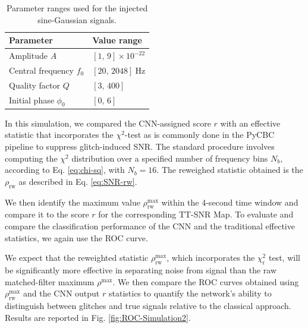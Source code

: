 \documentclass[aps,prd,twocolumn,superscriptaddress,nofootinbib, longbibliography]{revtex4-2}
\begin{document}
\begin{table}[htbp]
  \centering
  \caption{Parameter ranges used for the injected sine-Gaussian signals.}
  \label{tab:sine-Gaussian}
  \begin{tabular}{ |p{3.5cm}||p{4.5cm}| }
    \hline
    \textbf{Parameter} & \textbf{Value range} \\
    \hline
    Amplitude \( A \) & \( [1,\,9]\times10^{-22} \) \\
    \hline
    Central frequency \( f_0 \) & \( [20,\, 2048]~\mathrm{Hz} \) \\
    \hline
    Quality factor \( Q \) & \( [3,\, 400] \) \\
    \hline
    Initial phase \( \phi_0 \) & \( [0,\, 6] \) \\
    \hline
  \end{tabular}
\end{table}

	In this simulation, we compared the CNN-assigned score $r$ with an effective statistic that incorporates the $\chi^2$-test as is commonly done in the PyCBC pipeline to suppress glitch-induced SNR. 
	The standard procedure involves computing the $\chi^2$ distribution over a specified number of frequency bins $N_b$, according to Eq. \ref{eq:chi-sq}, with $N_b = 16$. The reweighed statistic obtained is the $\rho_\mathrm{rw}$ as described in Eq. \ref{eq:SNR-rw}.

	We then identify the maximum value $\rho_\mathrm{rw}^\mathrm{max}$ within the 4-second time window and compare it to the score $r$ for the corresponding TT-SNR Map. To evaluate and compare the classification performance of the CNN and the traditional effective statistics, we again use the ROC curve.
	
	We expect that the reweighted statistic $\rho_\mathrm{rw}^\mathrm{max}$, which incorporates the $\chi^2_\mathrm{r}$ test, will be significantly more effective in separating noise from signal than the raw matched-filter maximum $\rho^\mathrm{max}$.
	We then compare the ROC curves obtained using $\rho_\mathrm{rw}^\mathrm{max}$ and the CNN output $r$ statistics to quantify the network's ability to distinguish between glitches and true signals relative to the classical approach. Results are reported in Fig. \ref{fig:ROC-Simulation2}.
	
\end{document}
